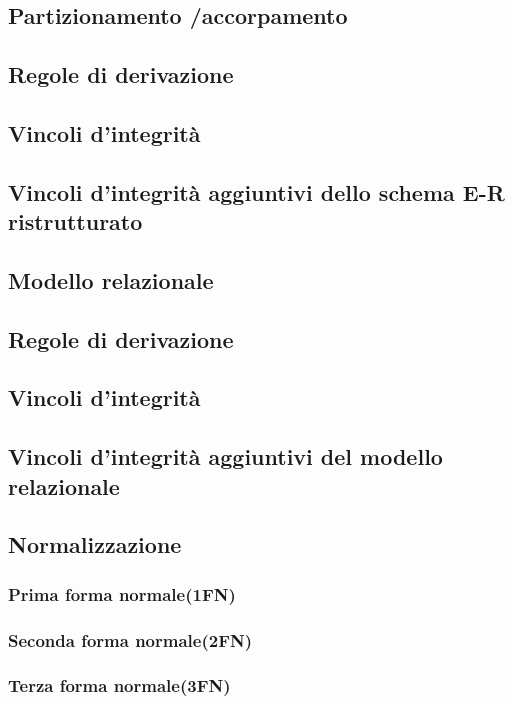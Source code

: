 \documentclass[legalpaper]{article}
\begin{document}
\subsection{Partizionamento /accorpamento}

\subsection{Regole di derivazione}

\subsection{Vincoli d'integrità}

\subsection{Vincoli d'integrità aggiuntivi dello schema E-R ristrutturato}

\subsection{Modello relazionale}


\subsection{Regole di derivazione}

\subsection{Vincoli d'integrità}

\subsection{Vincoli d'integrità aggiuntivi del modello relazionale}

\subsection{Normalizzazione}
\subsubsection{Prima forma normale(1FN)}
\subsubsection{Seconda forma normale(2FN)}
\subsubsection{Terza forma normale(3FN)}
\end{document}
